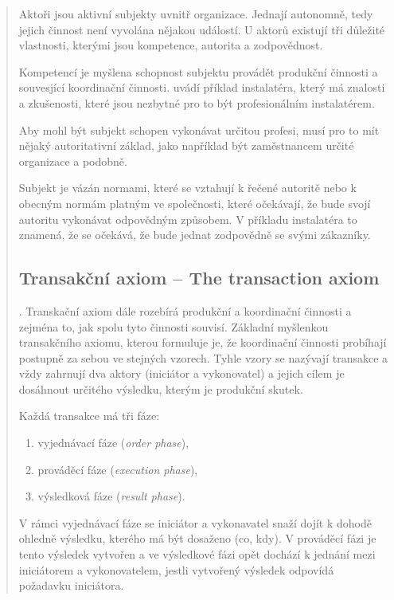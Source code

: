 \documentclass[]{article}
\begin{document}
\begin{quote}
Aktoři jsou aktivní subjekty uvnitř organizace. Jednají autonomně, tedy jejich činnost není vyvolána nějakou událostí. \cite{Dietz2006} U aktorů existují tři důležité vlastnosti, kterými jsou kompetence, autorita a zodpovědnost.

Kompetencí je myšlena schopnost subjektu provádět produkční činnosti a souvesjící koordinační činnosti. \cite{Dietz2006} uvádí příklad instalatéra, který má znalosti a zkušenosti, které jsou nezbytné pro to být profesionálním instalatérem.

Aby mohl být subjekt schopen vykonávat určitou profesi, musí pro to mít nějaký autoritativní základ, jako například být zaměstnancem určité organizace a podobně.

Subjekt je vázán normami, které se vztahují k řečené autoritě nebo k obecným normám platným ve společnosti, které očekávají, že bude svojí autoritu vykonávat odpovědným způsobem. V příkladu instalatéra to znamená, že se očekává, že bude jednat zodpovědně se svými zákazníky.

\subsection{Transakční axiom – The transaction axiom} \label{sec:transakcni_axiom}.
Transkační axiom dále rozebírá produkční a koordinační činnosti a zejména to, jak spolu tyto činnosti souvisí. Základní myšlenkou transakčního axiomu, kterou formuluje \cite{Dietz2006} je, že koordinační činnosti probíhají postupně za sebou ve stejných vzorech. Tyhle vzory se nazývají transakce a vždy zahrnují dva aktory (iniciátor a vykonovatel) a jejich cílem je dosáhnout určitého výsledku, kterým je produkční skutek.

Každá transakce má tři fáze:

\begin{enumerate}
\item vyjednávací fáze (\textit{order phase}),
\item prováděcí fáze (\textit{execution phase}),
\item výsledková fáze (\textit{result phase}).
\end{enumerate}

V rámci vyjednávací fáze se iniciátor a vykonavatel snaží dojít k dohodě ohledně výsledku, kterého má být dosaženo (co, kdy). V prováděcí fázi je tento výsledek vytvořen a ve výsledkové fázi opět dochází k jednání mezi iniciátorem a vykonovatelem, jestli vytvořený výsledek odpovídá požadavku iniciátora.


\end{quote}
\end{document}
